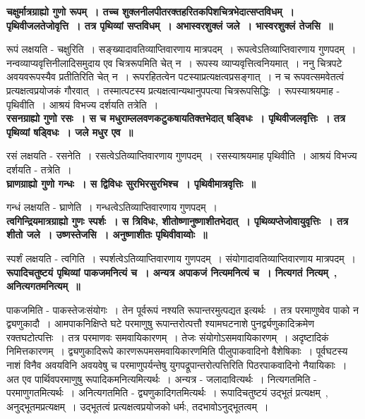 	{\bfseries चक्षुर्मात्रग्राह्यो गुणो रूपम्~। तच्च शुक्लनीलपीतरक्तहरितकपिशचित्रभेदात्सप्तविधम्~। पृथिवीजलतेजोवृत्ति~। तत्र पृथिव्यां सप्तविधम्~। अभास्वरशुक्लं जले~। भास्वरशुक्लं तेजसि~॥}\par
		रूपं लक्षयति - चक्षुरिति~। सङ्ख्यादावतिव्याप्तिवारणाय मात्रपदम्~। रूपत्वेऽतिव्याप्तिवारणाय गुणपदम्~। नन्वव्याप्यवृत्तिनीलादिसमुदाय एव चित्ररूपमिति चेत् न~। रूपस्य व्याप्यवृत्तित्वनियमात्~। ननु चित्रपटे अवयवरूपस्यैव प्रतीतिरिति चेत् न~। रूपरहितत्वेन पटस्याप्रत्यक्षत्वप्रसङ्गात्~। न च रूपवत्समवेतत्वं प्रत्यक्षत्वप्रयोजकं गौरवात्~। तस्मात्पटस्य प्रत्यक्षत्वान्यथानुपपत्या चित्ररूपसिद्धिः~। रूपस्याश्रयमाह - पृथिवीति~। आश्रयं विभज्य दर्शयति तत्रेति~।\\[10pt]
	{\bfseries रसनग्राह्यो गुणो रसः~। स च मधुराम्ललवणकटुकषायतिक्तभेदात् षड्विधः~। पृथिवीजलवृत्तिः~। तत्र पृथिव्यां षड्विधः~। जले मधुर एव~॥}\par
		रसं लक्षयति - रसनेति~। रसत्वेऽतिव्याप्तिवारणाय गुणपदम्~। रसस्याश्रयमाह पृथिवीति~। आश्रयं विभज्य दर्शयति - तत्रेति~।\\[10pt]
	{\bfseries घ्राणग्राह्यो गुणो गन्धः~। स द्विविधः सुरभिरसुरभिश्च~। पृथिवीमात्रवृत्तिः~॥}\par
		गन्धं लक्षयति - घ्राणेति~। गन्धत्वेऽतिव्याप्तिवारणाय गुणपदम्~।\\[10pt]
	{\bfseries त्वगिन्द्रियमात्रग्राह्यो गुणः स्पर्शः~। स त्रिविधः, शीतोष्णानुष्णाशीतभेदात्~। पृथिव्यप्तेजोवायुवृत्तिः~। तत्र शीतो जले~। उष्णस्तेजसि~। अनुष्णाशीतः पृथिवीवाय्वोः~॥}\par
		स्पर्शं लक्षयति - त्वगिति~। स्पर्शत्वेऽतिव्याप्तिवारणाय गुणपदम्~। संयोगादावतिव्याप्तिवारणाय मात्रपदम्~।\\[10pt]
	{\bfseries रूपादिचतुष्टयं पृथिव्यां पाकजमनित्यं च~। अन्यत्र अपाकजं नित्यमनित्यं च~। नित्यगतं नित्यम्~, अनित्यगतमनित्यम्~॥}\par
		पाकजमिति - पाकस्तेजःसंयोगः~। तेन पूर्वरूपं नश्यति रूपान्तरमुत्पद्यत इत्यर्थः~। तत्र परमाणुष्वेव पाको न द्व्यणुकादौ~। आमपाकनिक्षिप्ते घटे परमाणुषु रूपान्तरोत्पत्तौ श्यामघटनाशे पुनर्द्व्यणुकादिक्रमेण रक्तघटोत्पत्तिः~। तत्र परमाणवः समवायिकारणम्~। तेजः संयोगोऽसमवायिकारणम्~। अदृष्टादिकं निमित्तकारणम्~। द्व्यणुकादिरूपे कारणरूपमसमवायिकारणमिति पीलुपाकवादिनो वैशेषिकाः~। पूर्वघटस्य नाशं विनैव अवयविनि अवयवेषु च परमाणुपर्यन्तेषु युगपद्रूपान्तरोत्पत्तिरिति पिठरपाकवादिनो नैयायिकाः~। अत एव पार्थिवपरमाणुषु रूपादिकमनित्यमित्यर्थः~। अन्यत्र - जलादावित्यर्थः~। नित्यगतमिति - परमाणुगतमित्यर्थः~। अनित्यगतमिति - द्व्यणुकादिगतमित्यर्थः~। रूपादिचतुष्टयं उद्भूतं प्रत्यक्षम्~, अनुद्भूतमप्रत्यक्षम्~। उद्भूतत्वं प्रत्यक्षत्वप्रयोजको धर्मः, तदभावोऽनुद्भूतत्वम्~।\\[10pt]
